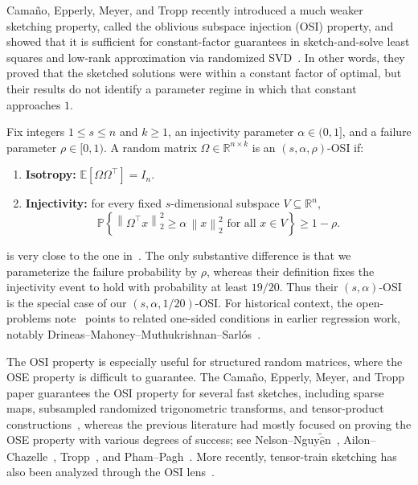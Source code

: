 \documentclass[onefignum,onetabnum]{siamart251216}
\newcommand{\R}{\mathbb{R}}
\newcommand{\E}{\mathbb{E}}
\newcommand{\Prob}{\mathbb{P}}
\newcommand{\norm}[1]{\left\lVert #1 \right\rVert}
\begin{document}
Cama\~no, Epperly, Meyer, and Tropp recently introduced a much weaker sketching property, called the oblivious subspace injection (OSI) property, and showed that it is sufficient for constant-factor guarantees in sketch-and-solve least squares and low-rank approximation via randomized SVD~\cite[Theorems~2.2 and~2.7]{CamanoEtAl2025}.  In other words, they proved that the sketched solutions were within a constant factor of optimal,  but their results do not identify a parameter regime in which that constant approaches $1$. 

\begin{definition}
Fix integers $1 \le s \le n$ and $k\ge 1$, an injectivity parameter $\alpha \in (0,1]$, and a failure parameter $\rho \in [0,1)$. A random matrix $\Omega \in \R^{n\times k}$ is an $(s,\alpha,\rho)$-OSI if:
\begin{enumerate}[label=(\roman*),leftmargin=1.8em]
    \item \textbf{Isotropy:} $\E[\Omega\Omega^\top] = I_n$.
    \item \textbf{Injectivity:} for every fixed $s$-dimensional subspace $V \subseteq \R^n$,
    \[
        \Prob\!\left\{ \norm{\Omega^\top x}_2^2 \ge \alpha\,\norm{x}_2^2
        \text{ for all } x \in V \right\} \ge 1-\rho.
    \]
\end{enumerate}
\label{def:OSI}
\end{definition}
 is very close to the one in~\cite{CamanoEtAl2025}. The only substantive difference is that we parameterize the failure probability by $\rho$, whereas their definition fixes the injectivity event to hold with probability at least $19/20$. Thus their $(s,\alpha)$-OSI is the special case of our $(s,\alpha,1/20)$-OSI.
For historical context, the open-problems note~\cite[\S5.1]{AmselEtAl2026} points to related one-sided conditions in earlier regression work, notably Drineas--Mahoney--Muthukrishnan--Sarl\'os~\cite{DrineasMahoneyMuthukrishnanSarlos2011}.

The OSI property is especially useful for structured random matrices, where the OSE property is difficult to guarantee.  The Cama\~no, Epperly, Meyer, and Tropp paper guarantees the OSI property for several fast sketches,  including sparse maps, subsampled randomized trigonometric transforms, and tensor-product constructions~\cite{CamanoEtAl2025}, whereas the previous literature had mostly focused on proving the OSE property with various degrees of success; see Nelson--Nguy$\tilde{\hat{\mathrm{e}}}$n~\cite{NelsonNguyen2013}, Ailon--Chazelle~\cite{AilonChazelle2009}, Tropp~\cite{Tropp2011}, and Pham--Pagh~\cite{PhamPagh2013}. More recently, tensor-train sketching has also been analyzed through the OSI lens~\cite{CazeauxDupuyJustiniano2026}.
\end{document}
